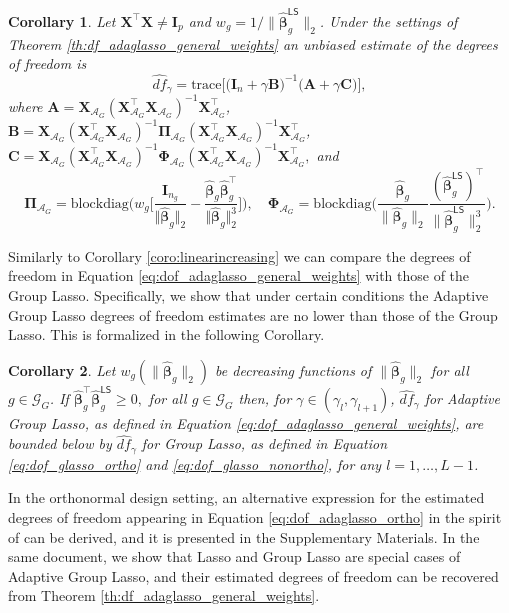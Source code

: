 \documentclass[a4paper, 12pt]{article}
\newcommand{\Aset}{\mathcal{A}}
\newcommand{\betahat}{\widehat{\boldsymbol\beta}}
\newcommand{\trace}{\mathrm{trace}}
\newcommand{\T}{\top}
\def\bbeta{\boldsymbol{\beta}}
\def\bPi{\boldsymbol{\Pi}}
\def\bPhi{\boldsymbol{\Phi}}
\def\bA{\mathbf{A}}
\def\bB{\mathbf{B}}
\def\bC{\mathbf{C}}
\def\bI{\mathbf{I}}
\def\bX{\mathbf{X}}
\newtheorem{corollary}{Corollary}
\begin{document}
\begin{corollary}
\label{th:df_adaglasso_nonortho}
Let $\bX^{\T}\bX\neq \bI_p$ and $w_g = 1/\lVert \widehat{\bbeta}_g^{\mathsf{LS}}\rVert_2$. Under the settings of Theorem \ref{th:df_adaglasso_general_weights} an unbiased estimate of the degrees of freedom is
\begin{equation}
\widehat{df}_\gamma = \trace \big[ \big(\bI_n+\gamma \bB \big)^{-1} \big(\bA + \gamma\bC \big) \big],
\end{equation}
where $\bA = \bX_{\Aset_G} (\bX_{\Aset_G}^{\T}\bX_{\Aset_G})^{-1}\bX_{\Aset_G}^{\T}$, $\bB =\bX_{\Aset_G}(\bX_{\Aset_G}^{\T}\bX_{\Aset_G})^{-1}\bPi_{\Aset_G}(\bX_{\Aset_G}^{\T}\bX_{\Aset_G})^{-1}\bX_{\Aset_G}^{\T}$, \\
$\bC =  \bX_{\Aset_G} (\bX_{\Aset_G}^{\T}\bX_{\Aset_G})^{-1}\bPhi_{\Aset_G} (\bX_{\Aset_G}^{\T}\bX_{\Aset_G})^{-1}\bX_{\Aset_G}^{\T},$ and
\begin{equation*}
   \bPi_{\Aset_G} = \mathrm{blockdiag}\bigg(w_g\bigg[\frac{\bI_{n_g}}{\Vert\betahat_g\Vert_2}-\frac{\betahat_g\betahat_g^{\T}}{\Vert\betahat_g\Vert_2^3}\bigg]\bigg), \quad
   \bPhi_{\Aset_G} = \mathrm{blockdiag} \bigg( \frac{\widehat{\bbeta}_g}{\lVert \widehat{\bbeta}_g \rVert_2}\frac{(\widehat{\bbeta}_{g}^{\mathsf{LS}})^{\T}}{\lVert \widehat{\bbeta}_{g}^{\mathsf{LS}}\rVert_2^3} \bigg). 
\end{equation*}
\end{corollary}
%
\noindent Similarly to Corollary \ref{coro:linearincreasing} we can compare the degrees of freedom in Equation \eqref{eq:dof_adaglasso_general_weights} with those of the Group Lasso. Specifically, we show that under certain conditions the Adaptive Group Lasso degrees of freedom estimates are no lower than those of the Group Lasso. This is formalized in the following Corollary.
%
\begin{corollary}
\label{coro:bounds_df_adaglasso}
Let $w_g(\lVert \widehat{\bbeta}_g \rVert_2)$ be decreasing functions of $\lVert \widehat{\bbeta}_g \rVert_2$ for all $g\in \mathcal{G}_G$. If $\widehat{\bbeta}^{\T}_g \widehat{\bbeta}^{\mathsf{LS}}_g  \geq 0,$  for all $g\in \mathcal{G}_G$ then, for $\gamma \in (\gamma_l, \gamma_{l+1})$,
$\widehat{df}_\gamma$ for Adaptive Group Lasso, as defined in Equation \eqref{eq:dof_adaglasso_general_weights}, are bounded below by  $\widehat{df}_\gamma$ for Group Lasso, as defined in Equation \eqref{eq:dof_glasso_ortho} and \eqref{eq:dof_glasso_nonortho}, for any $l = 1, \dots, L-1$.
\end{corollary}
%
\noindent In the orthonormal design setting, an alternative expression for the estimated degrees of freedom appearing in Equation \eqref{eq:dof_adaglasso_ortho} in the spirit of \cite{yuan:2006:glasso} can be derived, and it is presented %
in the Supplementary Materials. In the same document, %
we show that Lasso and Group Lasso are special cases of Adaptive Group Lasso, and their estimated degrees of freedom can be recovered from Theorem \ref{th:df_adaglasso_general_weights}.
\end{document}
